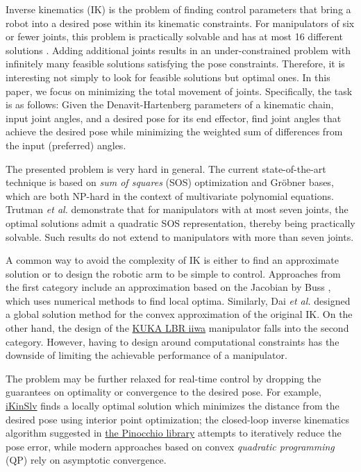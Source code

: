 Inverse kinematics (IK) is the problem of finding control parameters that bring a robot into a desired pose within its kinematic constraints. For manipulators of six or fewer joints, this problem is practically solvable and has at most 16 different solutions \cite{Manocha}. Adding additional joints results in an under-constrained problem with infinitely many feasible solutions satisfying the pose constraints. Therefore, it is interesting not simply to look for feasible solutions but optimal ones. In this paper, we focus on minimizing the total movement of joints. Specifically, the task is as follows: Given the Denavit-Hartenberg parameters \cite{Spong2020-mt} of a kinematic chain, input joint angles, and a desired pose for its end effector, find joint angles that achieve the desired pose while minimizing the weighted sum of differences from the input (preferred) angles.

The presented problem is very hard in general. The current state-of-the-art technique is based on \emph{sum of squares} (SOS) optimization and Gröbner bases, which are both NP-hard in the context of multivariate polynomial equations. Trutman \textit{et al.} demonstrate \cite{trutman2022globally} that for manipulators with at most seven joints, the optimal solutions admit a quadratic SOS representation, thereby being practically solvable. Such results do not extend to manipulators with more than seven joints.

A common way to avoid the complexity of IK is either to find an approximate solution or to design the robotic arm to be simple to control.
Approaches from the first category include an approximation
based on the Jacobian by Buss \cite{Buss_undated-fo}, which uses numerical methods to find local optima. Similarly, Dai \textit{et al.} \cite{Dai2019-uf} designed a global solution method for the convex approximation of the original IK. On the other hand, the design of the \href{https://www.kuka.com/en-us/products/robotics-systems/industrial-robots/lbr-iiwa}{KUKA LBR iiwa} manipulator falls into the second category. However, having to design around computational constraints has the downside of limiting the achievable performance of a manipulator.

The problem may be further relaxed for real-time control by dropping the guarantees on optimality or convergence to the desired pose. For example, \href{https://robotology.github.io/robotology-documentation/doc/html/group__iKinSlv.html}{iKinSlv} finds a locally optimal solution which minimizes the distance from the desired pose using interior point optimization; the closed-loop inverse kinematics algorithm suggested in \href{https://github.com/stack-of-tasks/pinocchio/blob/97a00a983e66fc0a58667f9671e2d806ba9b730b/examples/inverse-kinematics.cpp}{the Pinocchio library} attempts to iteratively reduce the pose error, while modern approaches \cite{ExampleQP} based on convex \emph{quadratic programming} (QP) rely on asymptotic convergence.

